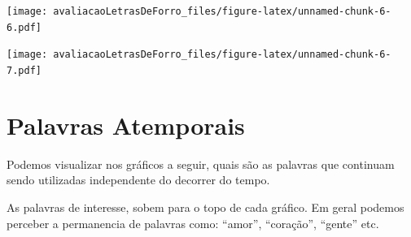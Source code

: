 \documentclass[]{article}
\newenvironment{Shaded}{\begin{snugshade}}{\end{snugshade}}
\newcommand{\DataTypeTok}[1]{\textcolor[rgb]{0.13,0.29,0.53}{#1}}
\newcommand{\DecValTok}[1]{\textcolor[rgb]{0.00,0.00,0.81}{#1}}
\newcommand{\FloatTok}[1]{\textcolor[rgb]{0.00,0.00,0.81}{#1}}
\newcommand{\KeywordTok}[1]{\textcolor[rgb]{0.13,0.29,0.53}{\textbf{#1}}}
\newcommand{\NormalTok}[1]{#1}
\newcommand{\OperatorTok}[1]{\textcolor[rgb]{0.81,0.36,0.00}{\textbf{#1}}}
\newcommand{\StringTok}[1]{\textcolor[rgb]{0.31,0.60,0.02}{#1}}
\begin{document}
\texttt{[image: avaliacaoLetrasDeForro\_files/figure-latex/unnamed-chunk-6-6.pdf]}

\begin{Shaded}
\end{Shaded}

\texttt{[image: avaliacaoLetrasDeForro\_files/figure-latex/unnamed-chunk-6-7.pdf]}

\hypertarget{palavras-atemporais}{%
\section{Palavras Atemporais}\label{palavras-atemporais}}

Podemos visualizar nos gráficos a seguir, quais são as palavras que
continuam sendo utilizadas independente do decorrer do tempo.

As palavras de interesse, sobem para o topo de cada gráfico. Em geral
podemos perceber a permanencia de palavras como: ``amor'', ``coração'',
``gente'' etc.
\end{document}
